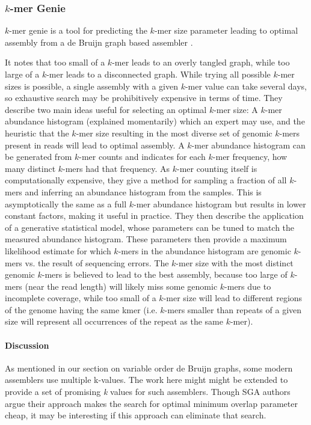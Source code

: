 \subsubsection{$k$-mer Genie}

$k$-mer genie is a tool for predicting the $k$-mer size parameter leading to optimal assembly from a de Bruijn graph based assembler \cite{chikhi2013informed}.

It notes that too small of a $k$-mer leads to an overly tangled graph, while too large of a $k$-mer leads to a disconnected graph.
While trying all possible $k$-mer sizes is possible, a single assembly with a given $k$-mer value can take several days, so exhaustive search may be prohibitively expensive in terms of time.
They describe two main ideas useful for selecting an optimal $k$-mer size: A $k$-mer abundance histogram (explained momentarily) which an expert may use, and the heuristic that the $k$-mer size resulting in the most diverse set of genomic $k$-mers present in reads will lead to optimal assembly.
A $k$-mer abundance histogram can be generated from $k$-mer counts and indicates for each $k$-mer frequency, how many distinct $k$-mers had that frequency.
As $k$-mer counting itself is computationally expensive, they give a method for sampling a fraction of all $k$-mers and inferring an abundance histogram from the samples.
This is asymptotically the same as a full $k$-mer abundance histogram but results in lower constant factors, making it useful in practice.
They then describe the application of a generative statistical model, whose parameters can be tuned to match the measured abundance histogram.
These parameters then provide a maximum likelihood  estimate for which $k$-mers in the abundance histogram are genomic $k$-mers vs. the result of sequencing errors.
The $k$-mer size with the most distinct genomic $k$-mers is believed to lead to the best assembly, because too large of $k$-mers (near the read length) will likely miss some genomic $k$-mers due to incomplete coverage, while too small of a $k$-mer size will lead to different regions of the genome having the same kmer (i.e. $k$-mers smaller than repeats of a given size will represent all occurrences of the repeat as the same $k$-mer).

\paragraph{Discussion}

As mentioned in our section on variable order de Bruijn graphs, some modern assemblers use multiple k-values.  The work here might might be extended to provide a set of promising \emph{k} values for such assemblers.  Though SGA authors argue their approach makes the search for optimal minimum overlap parameter cheap, it may be interesting if this approach can eliminate that search.


